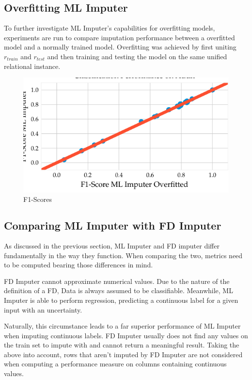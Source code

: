 \subsection{Overfitting ML Imputer}
To further investigate ML Imputer's capabilities for overfitting models, experiments are run to compare imputation performance between a overfitted model and a normally trained model.
Overfitting was achieved by first uniting \( r_{train} \) and \( r_{test} \) and then training and testing the model on the same unified relational instance.

\begin{figure}[ht]
     \centering
     \includegraphics[width=.8\textwidth]{../figures/adult/f1_ml_overfit_adult.pdf}
     \caption{F1-Scores}
     \label{fig:f1-ml-overfit-adult}
 \end{figure}


\subsection{Comparing ML Imputer with FD Imputer}
As discussed in the previous section, ML Imputer and FD imputer differ fundamentally in the way they function.
When comparing the two, metrics need to be computed bearing those differences in mind.

FD Imputer cannot approximate numerical values.
Due to the nature of the definition of a FD, Data is always assumed to be classifiable.
Meanwhile, ML Imputer is able to perform regression, predicting a continuous label for a given input with an uncertainty.

Naturally, this circumstance leads to a far superior performance of ML Imputer when imputing continuous labels.
FD Imputer usually does not find any values on the train set to impute with and cannot return a meaningful result.
Taking the above into account, rows that aren't imputed by FD Imputer are not considered when computing a performance measure on columns containing continuous values.

